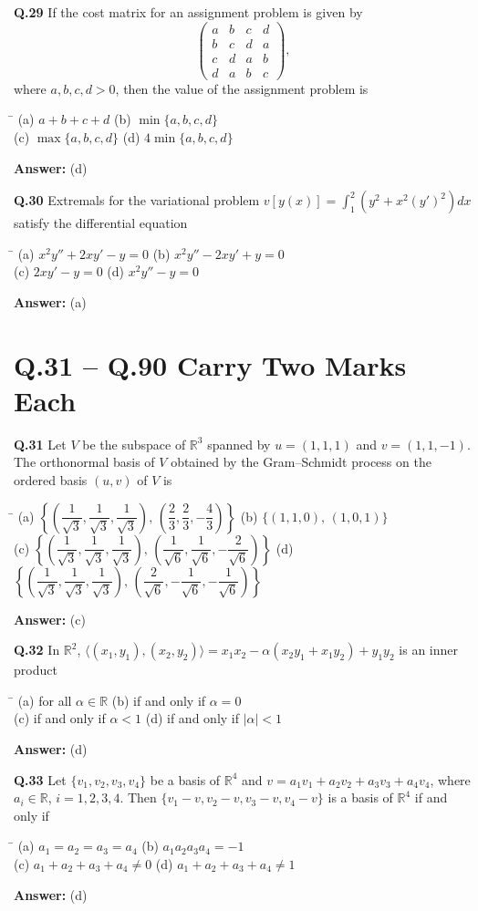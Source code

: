 \documentclass[11pt,a4paper]{article}
\newcommand{\optsfour}[4]{%
  \begin{tabbing}
    \hspace{0.48\linewidth}\=\kill
    (a) #1 \> (b) #2 \\[2pt]
    (c) #3 \> (d) #4
  \end{tabbing}%
}
\newcommand{\ans}[1]{\textbf{Answer:} #1\par\medskip}
\begin{document}
\textbf{Q.29} If the cost matrix for an assignment problem is given by
\[
  \begin{pmatrix}
    a & b & c & d \\
    b & c & d & a \\
    c & d & a & b \\
    d & a & b & c
  \end{pmatrix},
\]
where $a, b, c, d > 0$, then the value of the assignment problem is
\optsfour{$a + b + c + d$}{$\min\{a, b, c, d\}$}{$\max\{a, b, c, d\}$}{$4\min\{a, b, c, d\}$}
\ans{(d)}

\textbf{Q.30} Extremals for the variational problem $v[y(x)] = \displaystyle\int_1^2 \left(y^2 + x^2 (y')^2\right)dx$ satisfy the differential equation
\optsfour{$x^2 y'' + 2xy' - y = 0$}{$x^2 y'' - 2xy' + y = 0$}{$2xy' - y = 0$}{$x^2 y'' - y = 0$}
\ans{(a)}

\section*{Q.31 -- Q.90 Carry Two Marks Each}

\textbf{Q.31} Let $V$ be the subspace of $\mathbb{R}^3$ spanned by $u = (1,1,1)$ and $v = (1,1,-1)$. The orthonormal basis of $V$ obtained by the Gram--Schmidt process on the ordered basis $(u, v)$ of $V$ is
\optsfour{$\left\{\left(\dfrac{1}{\sqrt{3}},\dfrac{1}{\sqrt{3}},\dfrac{1}{\sqrt{3}}\right),\, \left(\dfrac{2}{3},\dfrac{2}{3},-\dfrac{4}{3}\right)\right\}$}{$\{(1,1,0),\, (1,0,1)\}$}{$\left\{\left(\dfrac{1}{\sqrt{3}},\dfrac{1}{\sqrt{3}},\dfrac{1}{\sqrt{3}}\right),\, \left(\dfrac{1}{\sqrt{6}},\dfrac{1}{\sqrt{6}},-\dfrac{2}{\sqrt{6}}\right)\right\}$}{$\left\{\left(\dfrac{1}{\sqrt{3}},\dfrac{1}{\sqrt{3}},\dfrac{1}{\sqrt{3}}\right),\, \left(\dfrac{2}{\sqrt{6}},-\dfrac{1}{\sqrt{6}},-\dfrac{1}{\sqrt{6}}\right)\right\}$}
\ans{(c)}

\textbf{Q.32} In $\mathbb{R}^2$, $\langle (x_1, y_1), (x_2, y_2) \rangle = x_1 x_2 - \alpha(x_2 y_1 + x_1 y_2) + y_1 y_2$ is an inner product
\optsfour{for all $\alpha \in \mathbb{R}$}{if and only if $\alpha = 0$}{if and only if $\alpha < 1$}{if and only if $|\alpha| < 1$}
\ans{(d)}

\textbf{Q.33} Let $\{v_1, v_2, v_3, v_4\}$ be a basis of $\mathbb{R}^4$ and $v = a_1 v_1 + a_2 v_2 + a_3 v_3 + a_4 v_4$, where $a_i \in \mathbb{R}$, $i = 1, 2, 3, 4$. Then $\{v_1 - v, v_2 - v, v_3 - v, v_4 - v\}$ is a basis of $\mathbb{R}^4$ if and only if
\optsfour{$a_1 = a_2 = a_3 = a_4$}{$a_1 a_2 a_3 a_4 = -1$}{$a_1 + a_2 + a_3 + a_4 \ne 0$}{$a_1 + a_2 + a_3 + a_4 \ne 1$}
\ans{(d)}
\end{document}
